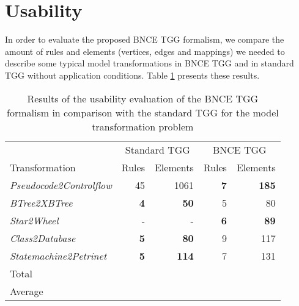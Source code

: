 
\section{Usability}
In order to evaluate the proposed BNCE TGG formalism, we compare the amount of rules and elements (vertices, edges and mappings) we needed to describe some typical model transformations in BNCE TGG and in standard TGG without application conditions. Table \ref{tab:formalism-eval} presents these results.


\begin{table}[h]
	\centering
	\begin{tabular}{l r r r r }
		\hline
						& \multicolumn{2}{c}{Standard TGG} & \multicolumn{2}{c}{BNCE TGG}\\
		Transformation 					& Rules & Elements 	& Rules & Elements\\
		\hline
		\emph{Pseudocode2Controlflow}	& 45			& 1061	& \textbf{7}	& \textbf{185} \\
		\emph{BTree2XBTree}				& \textbf{4}	& \textbf{50}	& 5		& 80 \\
		\emph{Star2Wheel}				& -				& -		& \textbf{6} 	& \textbf{89} \\
		\emph{Class2Database}			& \textbf{5}	& \textbf{80}	& 9 	& 117  \\
		\emph{Statemachine2Petrinet}	& \textbf{5}	& \textbf{114}	& 7		& 131 \\
		
		\hline
		Total					&  & 		&	& \\
		Average					&  & 		&	& \\
		\hline
	\end{tabular}
	\caption{Results of the usability evaluation of the BNCE TGG formalism in comparison with the standard TGG for the model transformation problem}
	\label{tab:formalism-eval}
\end{table}

